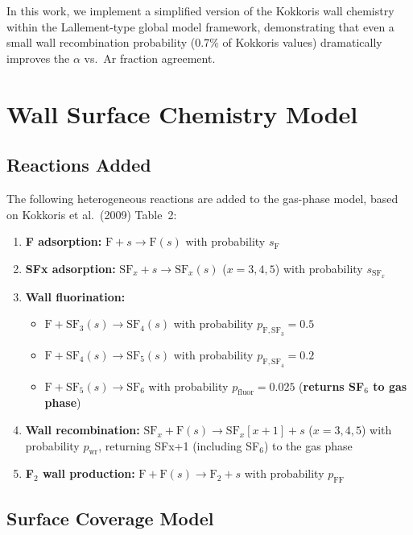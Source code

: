 \documentclass[11pt,a4paper]{article}
\newcommand{\SFx}{\mathrm{SF}_x}
\newcommand{\SFsix}{\mathrm{SF}_6}
\newcommand{\SFfive}{\mathrm{SF}_5}
\newcommand{\SFfour}{\mathrm{SF}_4}
\newcommand{\SFthree}{\mathrm{SF}_3}
\begin{document}
In this work, we implement a simplified version of the Kokkoris wall chemistry within the Lallement-type global model framework, demonstrating that even a small wall recombination probability (0.7\% of Kokkoris values) dramatically improves the $\alpha$ vs.\ Ar fraction agreement.

\section{Wall Surface Chemistry Model}

\subsection{Reactions Added}

The following heterogeneous reactions are added to the gas-phase model, based on Kokkoris et al.\ (2009) Table~2:

\begin{enumerate}
\item \textbf{F adsorption:} $\mathrm{F} + s \to \mathrm{F}(s)$ with probability $s_\mathrm{F}$
\item \textbf{SFx adsorption:} $\SFx + s \to \SFx(s)$ ($x = 3, 4, 5$) with probability $s_{\SFx}$
\item \textbf{Wall fluorination:}
  \begin{itemize}
  \item $\mathrm{F} + \SFthree(s) \to \SFfour(s)$ with probability $p_{\mathrm{F,SF}_3} = 0.5$
  \item $\mathrm{F} + \SFfour(s) \to \SFfive(s)$ with probability $p_{\mathrm{F,SF}_4} = 0.2$
  \item $\mathrm{F} + \SFfive(s) \to \SFsix$ with probability $p_\mathrm{fluor} = 0.025$ \quad (\textbf{returns SF$_6$ to gas phase})
  \end{itemize}
\item \textbf{Wall recombination:} $\SFx + \mathrm{F}(s) \to \SFx[x+1] + s$ ($x = 3, 4, 5$) with probability $p_\mathrm{wr}$, returning SFx+1 (including SF$_6$) to the gas phase
\item \textbf{F$_2$ wall production:} $\mathrm{F} + \mathrm{F}(s) \to \mathrm{F}_2 + s$ with probability $p_\mathrm{FF}$
\end{enumerate}

\subsection{Surface Coverage Model}
\end{document}
